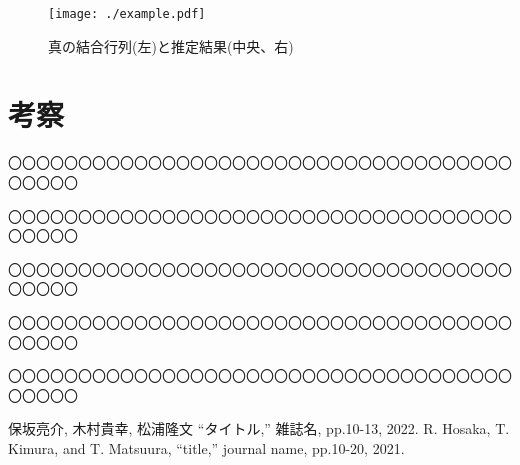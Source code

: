 \documentclass[dvipdfmx, A4j, twocolumn, 10.5pt]{jsarticle}
\begin{document}
\begin{figure}[htbp] %
\texttt{[image: ./example.pdf]}
\caption{真の結合行列(左)と推定結果(中央、右)} \label{fig:matrix}
\end{figure}


\section{考察}
〇〇〇〇〇〇〇〇〇〇〇〇〇〇〇〇〇〇〇〇〇〇〇〇〇〇〇〇〇〇〇〇〇〇〇〇〇〇〇〇〇

〇〇〇〇〇〇〇〇〇〇〇〇〇〇〇〇〇〇〇〇〇〇〇〇〇〇〇〇〇〇〇〇〇〇〇〇〇〇〇〇〇

〇〇〇〇〇〇〇〇〇〇〇〇〇〇〇〇〇〇〇〇〇〇〇〇〇〇〇〇〇〇〇〇〇〇〇〇〇〇〇〇〇

〇〇〇〇〇〇〇〇〇〇〇〇〇〇〇〇〇〇〇〇〇〇〇〇〇〇〇〇〇〇〇〇〇〇〇〇〇〇〇〇〇

〇〇〇〇〇〇〇〇〇〇〇〇〇〇〇〇〇〇〇〇〇〇〇〇〇〇〇〇〇〇〇〇〇〇〇〇〇〇〇〇〇

\fi

\begin{thebibliography}{99}
 保坂亮介, 木村貴幸, 松浦隆文 ``タイトル,'' 雑誌名, pp.10-13, 2022.
 R. Hosaka, T. Kimura, and T. Matsuura, ``title,'' journal name, pp.10-20, 2021.
\end{thebibliography}
\end{document}
